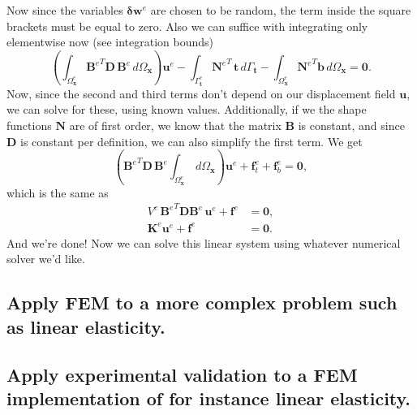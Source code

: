 \documentclass[acmtog]{acmart}
\begin{document}
%
Now since the variables $\boldsymbol \delta \boldsymbol w^e$ are chosen to be
random, the term inside the square brackets must be equal to zero. Also we can
suffice with integrating only elementwise now (see integration bounds)
%
\begin{equation}
  \left( \int_{\Omega_{\boldsymbol x}^e} {\boldsymbol B^e}^T \boldsymbol D \, \boldsymbol B^e \, d\Omega_{\boldsymbol x} \right) \boldsymbol u^e
- \int_{\Gamma_{\boldsymbol t}^e} {\boldsymbol N^e}^T  \, \boldsymbol t \, d\Gamma_{\boldsymbol t}
- \int_{\Omega_{\boldsymbol x}^e} {\boldsymbol N^e}^T \boldsymbol b \, d\Omega_{\boldsymbol x} = \boldsymbol 0.
\end{equation}
%
Now, since the second and third terms don't depend on our displacement field
$\boldsymbol u$, we can solve for these, using known values. Additionally, if
we the shape functions $\boldsymbol N$ are of first order, we know that the
matrix $\boldsymbol B$ is constant, and since $\boldsymbol D$ is constant per
definition, we can also simplify the first term. We get
%
\begin{equation}
  \left( {\boldsymbol B^e}^T \boldsymbol D \, \boldsymbol B^e \int_{\Omega_{\boldsymbol x}^e} \, d\Omega_{\boldsymbol x} \right) \boldsymbol u^e + \mathbf f_t^e + \mathbf f_b^e  = \boldsymbol 0,
\end{equation}
%
which is the same as
%
\begin{align}
  V^e \, {\boldsymbol B^e}^T \boldsymbol D \boldsymbol B^e \,\boldsymbol u^e + \mathbf f ^e & = \boldsymbol 0, \\
  \boldsymbol K^e \boldsymbol u^e + \mathbf f^e                                             & = \boldsymbol 0.
\end{align}
%
And we're done! Now we can solve this linear system using whatever numerical
solver we'd like.

\subsection{Apply FEM to a more complex problem such as linear elasticity.}
\subsection{Apply experimental validation to a FEM implementation of for instance linear
      elasticity.}
\end{document}
